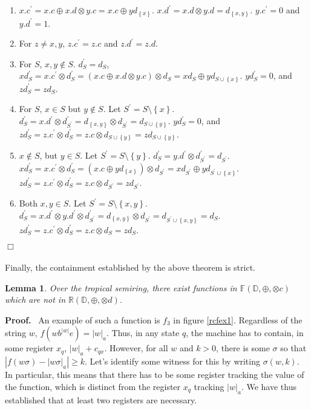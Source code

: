 \documentclass[11pt]{article}
\newtheorem{lemma}[theorem]{Lemma}
\def\Proof{{\bf Proof.}}
\def\qed{{\bf $\Box$}}
\def\qed{{\bf $\Box$}}
\newcommand{\domain}{\ensuremath{\mathbb{D}}}
\newcommand{\CF}{{\mathbb F}}
\newcommand{\reg}[1]{{\mathbb R}(#1)}
\newcommand{\sradd}{\oplus}
\newcommand{\srmul}{\otimes}
\begin{document}
\begin{enumerate}
\begin{enumerate}
\item $x.c^{\prime}=x.c\sradd x.d\srmul y.c=x.c\sradd yd_{\left\{ x\right\} }$.
$x.d^{\prime}=x.d\srmul y.d=d_{\left\{ x,y\right\} }$. $y.c^{\prime}=0$
and $y.d^{\prime}=1$.
\item For $z\neq x,y$, $z.c^{\prime}=z.c$ and $z.d^{\prime}=z.d$.
\item For $S$, $x,y\notin S$. $d_{S}^{\prime}=d_{S}$, $xd_{S}^{\prime}=x.c^{\prime}\srmul d_{S}^{\prime}=\left(x.c\sradd x.d\srmul y.c\right)\srmul d_{S}=xd_{S}\sradd yd_{S\cup\left\{ x\right\} }$.
$yd_{S}^{\prime}=0$, and $zd_{S}^{\prime}=zd_{S}$.
\item For $S$, $x\in S$ but $y\notin S$. Let $S^{\prime}=S\setminus\left\{ x\right\} $.
$d_{S}^{\prime}=x.d^{\prime}\srmul d_{S^{\prime}}^{\prime}=d_{\left\{ x,y\right\} }\srmul d_{S^{\prime}}=d_{S\cup\left\{ y\right\} }$.
$yd_{S}^{\prime}=0$, and $zd_{S}^{\prime}=z.c^{\prime}\srmul d_{S}^{\prime}=z.c\srmul d_{S\cup\left\{ y\right\} }=zd_{S\cup\left\{ y\right\} }$.
\item $x\notin S$, but $y\in S$. Let $S^{\prime}=S\setminus\left\{ y\right\} $.
$d_{S}^{\prime}=y.d^{\prime}\srmul d_{S^{\prime}}^{\prime}=d_{S^{\prime}}$.
$xd_{S}^{\prime}=x.c^{\prime}\srmul d_{S}^{\prime}=\left(x.c\sradd yd_{\left\{ x\right\} }\right)\srmul d_{S^{\prime}}=xd_{S^{\prime}}\sradd yd_{S^{\prime}\cup\left\{ x\right\} }$.
$zd_{S}^{\prime}=z.c^{\prime}\srmul d_{S}^{\prime}=z.c\srmul d_{S^{\prime}}=zd_{S^{\prime}}$.
\item Both $x,y\in S$. Let $S^{\prime}=S\setminus\left\{ x,y\right\} $.
$d_{S}^{\prime}=x.d^{\prime}\srmul y.d^{\prime}\srmul d_{S^{\prime}}^{\prime}=d_{\left\{ x,y\right\} }\srmul d_{S^{\prime}}=d_{S^{\prime}\cup\left\{ x,y\right\} }=d_{S}$.
$zd_{S}^{\prime}=z.c^{\prime}\srmul d_{S}^{\prime}=z.c\srmul d_{S}=zd_{S}$.\end{enumerate}
\end{enumerate}
\qed\\\\
Finally, the containment established by the above theorem is strict.

\begin{lemma}
Over the tropical semiring, there exist functions in $\CF\left(\domain,\sradd,\srmul c\right)$ which are not in $\reg{\domain,\sradd,\srmul d}$.
\end{lemma}
\Proof~
An example of such a function is $f_{3}$ in figure \ref{rcfex1}.
Regardless of the string $w$, $f\left(wb^{\left|w\right|}e\right)=\left|w\right|_{a}$.
Thus, in any state $q$, the machine has to contain, in some register
$x_{q}$, $\left|w\right|_{a}+c_{qx}$. However, for all $w$ and
$k>0$, there is some $\sigma$ so that $\left|f\left(w\sigma\right)-\left|w\sigma\right|_{a}\right|\geq k$.
Let's identify some witness for this by writing $\sigma\left(w,k\right)$.
In particular, this means that there has to be some register tracking
the value of the function, which is distinct from the register $x_{q}$
tracking $\left|w\right|_{a}$. We have thus established that at least
two registers are necessary.
\end{document}

